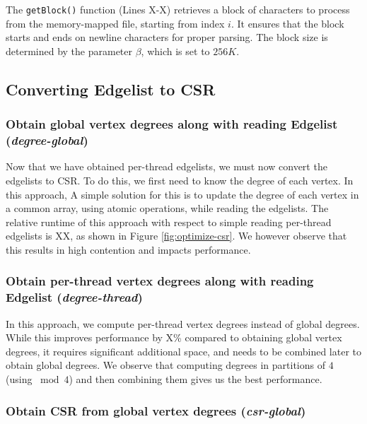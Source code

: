 The \texttt{getBlock()} function (Lines X-X) retrieves a block of characters to process from the memory-mapped file, starting from index $i$. It ensures that the block starts and ends on newline characters for proper parsing. The block size is determined by the parameter $\beta$, which is set to $256K$.





\subsection{Converting Edgelist to CSR}




\subsubsection{Obtain global vertex degrees along with reading Edgelist (\textit{degree-global})}

Now that we have obtained per-thread edgelists, we must now convert the edgelists to CSR. To do this, we first need to know the degree of each vertex. In this approach, A simple solution for this is to update the degree of each vertex in a common array, using atomic operations, while reading the edgelists. The relative runtime of this approach with respect to simple reading per-thread edgelists is XX, as shown in Figure \ref{fig:optimize-csr}. We however observe that this results in high contention and impacts performance.


\subsubsection{Obtain per-thread vertex degrees along with reading Edgelist (\textit{degree-thread})}

In this approach, we compute per-thread vertex degrees instead of global degrees. While this improves performance by X\% compared to obtaining global vertex degrees, it requires significant additional space, and needs to be combined later to obtain global degrees. We observe that computing degrees in partitions of $4$ (using $\bmod 4$) and then combining them gives us the best performance.


\subsubsection{Obtain CSR from global vertex degrees (\textit{csr-global})}

